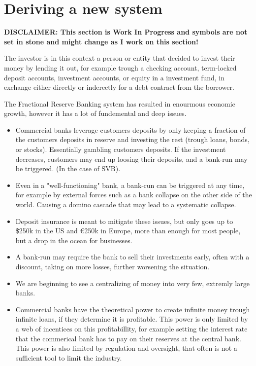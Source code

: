 \section{Deriving a new system}
\textbf{DISCLAIMER: This section is Work In Progress and symbols are not set in stone and might change as I work on this section!}

The investor is in this context a person or entity that decided to invest their money by lending it out, for example trough a checking account, term-locked deposit accounts, investment accounts, or equity in a investment fund, in exchange either directly or inderectly for a debt contract from the borrower.

The Fractional Reserve Banking system has resulted in enourmous economic growth, however it has a lot of fundemental and deep issues.
\begin{itemize}
    \item Commercial banks leverage customers deposits by only keeping a fraction of the customers deposits in reserve and investing the rest (trough loans, bonds, or stocks). Essentially gambling customers deposits. If the investment decreases, customers may end up loosing their deposits, and a bank-run may be triggered. (In the case of SVB). 
    \item Even in a "well-functioning" bank, a bank-run can be triggered at any time, for example by external forces such as a bank collapse on the other side of the world. Causing a domino cascade that may lead to a systematic collapse. 
    \item Deposit insurance is meant to mitigate these issues, but only goes up to \$250k in the US and €250k in Europe, more than enough for most people, but a drop in the ocean for businesses. 
    \item A bank-run may require the bank to sell their investments early, often with a discount, taking on more losses, further worsening the situation.
    \item We are beginning to see a centralizing of money into very few, extremly large banks.
    \item Commercial banks have the theoretical power to create infinite money trough infinite loans, if they determine it is profitable. This power is only limited by a web of incentices on this profitabillity, for example setting the interest rate that the commerical bank has to pay on their reserves at the central bank. This power is also limited by regulation and oversight, that often is not a sufficient tool to limit the industry. 

\end{itemize}
